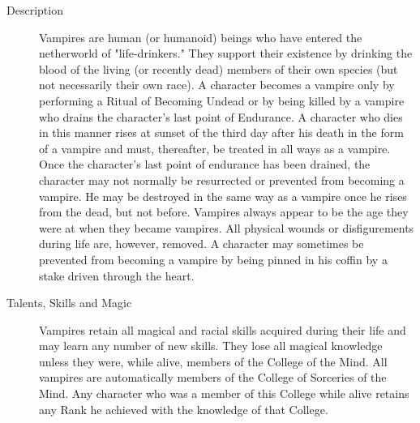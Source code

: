 \begin{multicols}{2}
\begin{description}
\item[Description]  Vampires are human (or humanoid) beings who
have entered the netherworld of "life-drinkers." They support
their existence by drinking the blood of the living (or recently
dead) members of their own species (but not necessarily their
own race). A character becomes a vampire only by performing a
Ritual of Becoming Undead or by being killed by a vampire who
drains the character's last point of Endurance. A character who
dies in this manner rises at sunset of the third day after his
death in the form of a vampire and must, thereafter, be treated
in all ways as a vampire. Once the character's last point of
endurance has been drained, the character may not normally be
resurrected or prevented from becoming a vampire. He may be
destroyed in the same way as a vampire once he rises from the
dead, but not before. Vampires always appear to be the age they
were at when they became vampires. All physical wounds or
disfigurements during life are, however, removed. A character
may sometimes be prevented from becoming a vampire by being
pinned in his coffin by a stake driven through the heart.


\item[Talents, Skills and Magic] Vampires retain all magical and racial skills acquired
during their life and may learn any number of new skills. They lose
all magical knowledge unless they were, while alive, members of the
College of the Mind. All vampires are automatically members of the
College of Sorceries of the Mind. Any character who was a member of
this College while alive retains any Rank he achieved with the
knowledge of that College.


\end{description}
\end{multicols}
